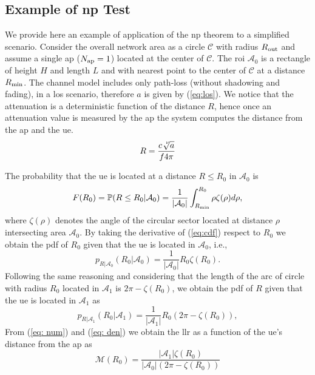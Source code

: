 \documentclass[draftcls,onecolumn,12pt]{IEEEtran}
\begin{document}
\subsection{Example of \ac{np} Test}\label{sec:los}

We provide here an example of application of the \ac{np} theorem to a simplified scenario. Consider the overall network area as a circle $\mathcal{C}$ with radius $R_{\rm out}$ and assume a single \ac{ap} ($N_{\rm ap} =1$) located at the center of $\mathcal{C}$. The \ac{roi} $\mathcal{A}_{0}$ is a rectangle of height $H$ and length $L$ and with nearest point to the center of $\mathcal{C}$ at a distance $R_{\rm min}$. The channel model includes only path-loss (without shadowing and fading), in a \ac{los} scenario, therefore $a$ is given by (\ref{eq:los}). We notice that the attenuation is a deterministic function of the distance $R$, hence once an attenuation value is measured by the \ac{ap} the system computes the distance from the \ac{ap} and the \ac{ue}.
\begin{equation}
    R = \frac{c\sqrt[\leftroot{-3}\uproot{3}\nu]a}{f 4 \pi}
\end{equation}

 The probability that the \ac{ue} is located at a distance $R\le R_0$ in $\mathcal{A}_0$ is
\begin{equation}\label{eq:cdf}
     F(R_0) = \mathbb{P}(R \le R_0|\mathcal{A}_0) = \frac{1}{|\mathcal{A}_0|}\int_{R_{\rm min}}^{R_0} \rho  \zeta(\rho ) d\rho ,
\end{equation}
where $\zeta(\rho )$ denotes the angle of the circular sector located at distance $\rho$ intersecting area $\mathcal{A}_0$. By taking the derivative of (\ref{eq:cdf}) respect to $R_0$ we obtain the \ac{pdf} of $R_0$ given that the \ac{ue} is located in $\mathcal{A}_0$, i.e.,
\begin{equation}\label{eq: num}
    p_{R|\mathcal{A}_0}(R_0 |\mathcal{A}_0) = \frac{1}{|\mathcal{A}_0|}R_0 \zeta(R_0).
\end{equation}
Following the same reasoning and considering that the length of the arc of circle with radius $R_0$ located in $\mathcal{A}_1$ is $2\pi - \zeta(R_0)$, we obtain the \ac{pdf} of  $R$ given that the \ac{ue} is located in $\mathcal{A}_1$ as
\begin{equation}\label{eq: den}
     p_{R|\mathcal{A}_1}(R_0 |\mathcal{A}_1) = \frac{1}{|\mathcal{A}_1|}R_0 \left(2\pi-\zeta(R_0)\right),
\end{equation}
From (\ref{eq: num}) and (\ref{eq: den}) we obtain the \ac{llr} as a function of the \ac{ue}'s distance from the \ac{ap} as
\begin{equation}
    \mathcal{M}(R_0) = \frac{|\mathcal{A}_1|\zeta(R_0)}{|\mathcal{A}_0|\left(2\pi-\zeta(R_0)\right)}
\end{equation}
\end{document}
